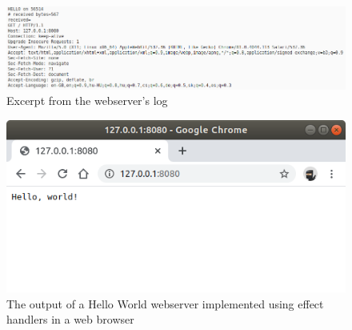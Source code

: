 \begin{figure}[h]
    \centering
    \includegraphics[height=.18\textheight]{screenshots/webserver_log.png}
    
    \caption{Excerpt from the webserver's log}
    \label{fig:app-screenshot-webserver-log}
\end{figure}

\begin{figure}[h]
    \centering
    \includegraphics[height=.2\textheight]{screenshots/webserver_hello_world.png}

    \caption[Web server output]{The output of a Hello World webserver implemented using effect handlers in a web browser}
    \label{fig:app-screenshot-webserver-hello-world}

\end{figure}
